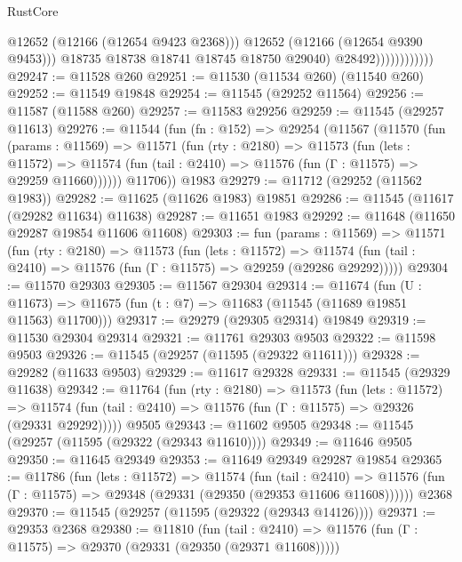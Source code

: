 \begin{lexlean}{RustCore}
\begin{coremodule}
                                  @12652
                                  (@12166 (@12654 @9423 @2368)))
                                @12652
                                (@12166 (@12654 @9390 @9453)))
                              @18735
                              @18738
                              @18741
                              @18745
                              @18750
                              @29040)
                            @28492))))))))))))
@29247 := @11528 @260
@29251 := @11530 (@11534 @260) (@11540 @260)
@29252 := @11549 @19848
@29254 := @11545 (@29252 @11564)
@29256 := @11587 (@11588 @260)
@29257 := @11583 @29256
@29259 := @11545 (@29257 @11613)
@29276 := @11544
    (fun (fn : @152) =>
    @29254
      (@11567
        (@11570
          (fun (params : @11569) =>
          @11571
            (fun (rty : @2180) =>
            @11573
              (fun (lets : @11572) =>
              @11574 (fun (tail : @2410) => @11576 (fun (Γ : @11575) => @29259 @11660))))))
        @11706))
    @1983
@29279 := @11712 (@29252 (@11562 @1983))
@29282 := @11625 (@11626 @1983) @19851
@29286 := @11545 (@11617 (@29282 @11634) @11638)
@29287 := @11651 @1983
@29292 := @11648 (@11650 @29287 @19854 @11606 @11608)
@29303 := fun (params : @11569) =>
  @11571
    (fun (rty : @2180) =>
    @11573
      (fun (lets : @11572) =>
      @11574 (fun (tail : @2410) => @11576 (fun (Γ : @11575) => @29259 (@29286 @29292)))))
@29304 := @11570 @29303
@29305 := @11567 @29304
@29314 := @11674
    (fun (U : @11673) => @11675 (fun (t : @7) => @11683 (@11545 (@11689 @19851 @11563) @11700)))
@29317 := @29279 (@29305 @29314) @19849
@29319 := @11530 @29304 @29314
@29321 := @11761 @29303 @9503
@29322 := @11598 @9503
@29326 := @11545 (@29257 (@11595 (@29322 @11611)))
@29328 := @29282 (@11633 @9503)
@29329 := @11617 @29328
@29331 := @11545 (@29329 @11638)
@29342 := @11764
    (fun (rty : @2180) =>
    @11573
      (fun (lets : @11572) =>
      @11574 (fun (tail : @2410) => @11576 (fun (Γ : @11575) => @29326 (@29331 @29292)))))
    @9505
@29343 := @11602 @9505
@29348 := @11545 (@29257 (@11595 (@29322 (@29343 @11610))))
@29349 := @11646 @9505
@29350 := @11645 @29349
@29353 := @11649 @29349 @29287 @19854
@29365 := @11786
    (fun (lets : @11572) =>
    @11574
      (fun (tail : @2410) =>
      @11576 (fun (Γ : @11575) => @29348 (@29331 (@29350 (@29353 @11606 @11608))))))
    @2368
@29370 := @11545 (@29257 (@11595 (@29322 (@29343 @14126))))
@29371 := @29353 @2368
@29380 := @11810
    (fun (tail : @2410) => @11576 (fun (Γ : @11575) => @29370 (@29331 (@29350 (@29371 @11608)))))

\end{coremodule}
\end{lexlean}
